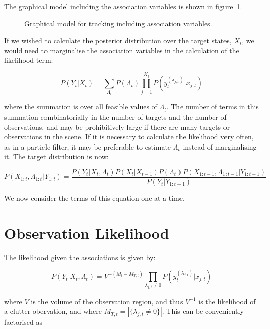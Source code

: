 The graphical model including the association variables is shown in figure~\ref{fig:HMMAssoc}.

\begin{figure}%

\caption{Graphical model for tracking including association variables.}%
\label{fig:HMMAssoc}%
\end{figure}

If we wished to calculate the posterior distribution over the target states, $X_t$, we would need to marginalise the association variables in the calculation of the likelihood term:

\begin{equation}
P(Y_t|X_t) = \sum_{\Lambda_t} P(\Lambda_t) \prod_{j=1}^{K_t} P(y_t^{(\lambda_{j,t})}|x_{j,t})
\label{eq:MarginaliseAssociations}
\end{equation}

where the summation is over all feasible values of $\Lambda_t$. The number of terms in this summation combinatorially in the number of targets and the number of observations, and may be prohibitively large if there are many targets or observations in the scene. If it is necessary to calculate the likelihood very often, as in a particle filter, it may be preferable to estimate $\Lambda_t$ instead of marginalising it. The target distribution is now:

\begin{equation}
P(X_{1:t}, \Lambda_{1:t}|Y_{1:t}) = \frac{P(Y_t|X_t, \Lambda_t) P(X_t|X_{t-1}) P(\Lambda_t) P(X_{1:t-1}, \Lambda_{1:t-1}|Y_{1:t-1})}{P(Y_t|Y_{1:t-1})}
\label{eq:MTPosterior}
\end{equation}

We now consider the terms of this equation one at a time.

\section{Observation Likelihood}
The likelihood given the associations is given by:

\begin{equation}
P(Y_t|X_t, \Lambda_t) = V^{-(M_t-M_{T,t})} \prod_{\lambda_{j,t} \ne 0} P(y_t^{(\lambda_{j,t})}|x_{j,t})
\label{eq:MTLikelihood}
\end{equation}

where $V$ is the volume of the observation region, and thus $V^{-1}$ is the likelihood of a clutter obervation, and where $M_{T,t} = \left| \{ \lambda_{j,t} \ne 0 \} \right|$. This can be conveniently factorised as

